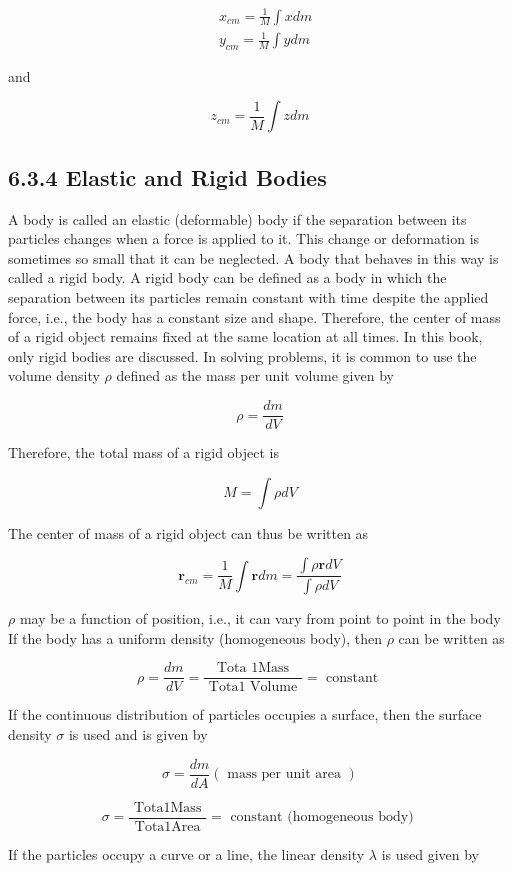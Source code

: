 \documentclass[10pt]{article}
\begin{document}
$$
\begin{aligned}
& x_{c m}=\frac{1}{M} \int x d m \\
& y_{c m}=\frac{1}{M} \int y d m
\end{aligned}
$$

and

$$
z_{c m}=\frac{1}{M} \int z d m
$$

\subsection*{6.3.4 Elastic and Rigid Bodies}
A body is called an elastic (deformable) body if the separation between its particles changes when a force is applied to it. This change or deformation is sometimes so small that it can be neglected. A body that behaves in this way is called a rigid body. A rigid body can be defined as a body in which the separation between its particles remain constant with time despite the applied force, i.e., the body has a constant size and shape. Therefore, the center of mass of a rigid object remains fixed at the same location at all times. In this book, only rigid bodies are discussed. In solving problems, it is common to use the volume density $\rho$ defined as the mass per unit volume given by

$$
\rho=\frac{d m}{d V}
$$

Therefore, the total mass of a rigid object is

$$
M=\int \rho d V
$$

The center of mass of a rigid object can thus be written as

$$
\mathbf{r}_{c m}=\frac{1}{M} \int \mathbf{r} d m=\frac{\int \rho \mathbf{r} d V}{\int \rho d V}
$$

$\rho$ may be a function of position, i.e., it can vary from point to point in the body If the body has a uniform density (homogeneous body), then $\rho$ can be written as

$$
\rho=\frac{d m}{d V}=\frac{\text { Tota 1Mass }}{\text { Tota1 Volume }}=\text { constant }
$$

If the continuous distribution of particles occupies a surface, then the surface density $\sigma$ is used and is given by

$$
\sigma=\frac{d m}{d A}(\text { mass per unit area })
$$

$$
\sigma=\frac{\text { Tota1Mass }}{\text { Tota1Area }}=\text { constant (homogeneous body) }
$$

If the particles occupy a curve or a line, the linear density $\lambda$ is used given by
\end{document}
